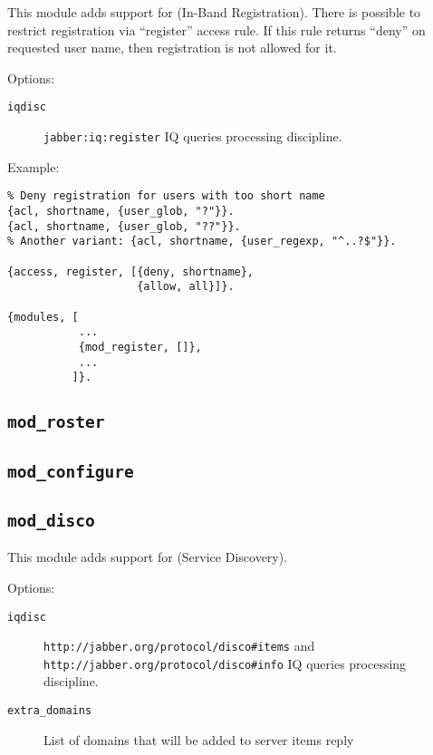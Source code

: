 \documentclass[10pt]{article}
\newcommand{\ns}[1]{\texttt{#1}}
\newcommand{\modroster}{\texttt{mod\_roster}}
\newcommand{\modconfigure}{\texttt{mod\_configure}}
\newcommand{\moddisco}{\texttt{mod\_disco}}
\begin{document}
This module adds support for
 (In-Band
Registration).  There is possible to restrict registration via ``register''
access rule.  If this rule returns ``deny'' on requested user name, then
registration is not allowed for it.

Options:
\begin{description}
\item[\texttt{iqdisc}] \ns{jabber:iq:register} IQ queries processing
  discipline.
\end{description}

Example:
\begin{verbatim}
% Deny registration for users with too short name
{acl, shortname, {user_glob, "?"}}.
{acl, shortname, {user_glob, "??"}}.
% Another variant: {acl, shortname, {user_regexp, "^..?$"}}.

{access, register, [{deny, shortname},
                    {allow, all}]}.

{modules, [
           ...
           {mod_register, []},
           ...
          ]}.
\end{verbatim}




\subsection{\modroster{}}
\label{sec:modroster}



\subsection{\modconfigure{}}
\label{sec:modconfigure}



\subsection{\moddisco{}}
\label{sec:moddisco}

This module adds support for
 (Service
Discovery).

Options:
\begin{description}
\item[\texttt{iqdisc}] \ns{http://jabber.org/protocol/disco#items} and
  \ns{http://jabber.org/protocol/disco#info} IQ queries processing discipline.
\item[\texttt{extra\_domains}] List of domains that will be added to server
  items reply
\end{description}
\end{document}

